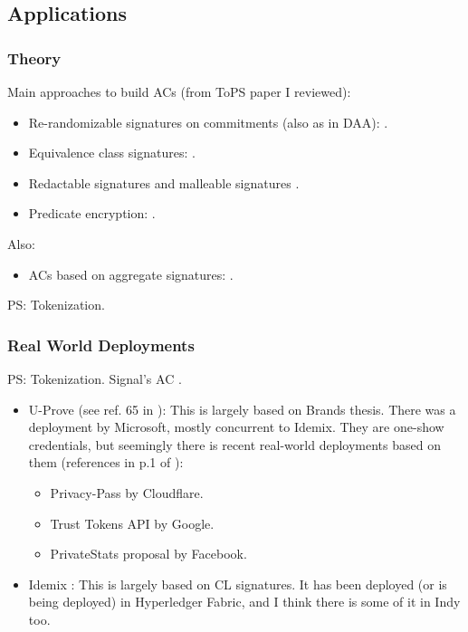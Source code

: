\subsection{Applications}
\label{ssec:acapplication}

\subsubsection{Theory}
\label{sssec:actheoryapp}

Main approaches to build ACs (from ToPS paper I reviewed):

\begin{itemize}
\item Re-randomizable signatures on commitments (also as in DAA):
  \cite{cl02,cl04,lmpy16,ps16}.
\item Equivalence class signatures: \cite{fhs19,hs14}.
\item Redactable signatures \cite{cdhk15,sand20} and malleable signatures
  \cite{ckl14}.
\item Predicate encryption: \cite{dmm+18}.
\end{itemize}

Also:

\begin{itemize}
  \item ACs based on aggregate signatures: \cite{cl11}.
\end{itemize}

PS: Tokenization.

\subsubsection{Real World Deployments}
\label{sssec:acrwdeploy}

PS: Tokenization.
Signal's AC \cite{cpz20}.

\begin{itemize}
\item U-Prove (see ref. 65 in \cite{hs21}):  This is largely based on Brands
  thesis. There was a deployment by Microsoft, mostly concurrent to Idemix.
  They are one-show credentials, but seemingly there is recent real-world
  deployments based on them (references in p.1 of \cite{hs21}):
  
  \begin{itemize}
  \item Privacy-Pass by Cloudflare.
  \item Trust Tokens API by Google.
  \item PrivateStats proposal by Facebook.
  \end{itemize}
  
\item Idemix \cite{ch02}: This is largely based on CL signatures. It has been
  deployed (or is being deployed) in Hyperledger Fabric, and I think there is
  some of it in Indy too.
\end{itemize}

